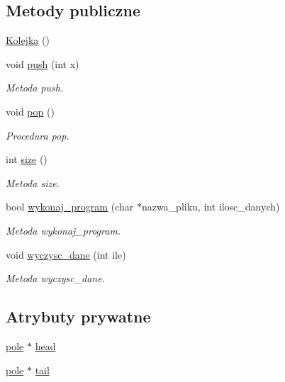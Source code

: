 \subsection*{Metody publiczne}
\begin{DoxyCompactItemize}
\item 
\hyperlink{class_kolejka_a37c886fdc73dce62b04da0381dec5484}{Kolejka} ()
\item 
void \hyperlink{class_kolejka_a220ee5f92afb7712ce2bc502decfa6c9}{push} (int x)
\begin{DoxyCompactList}\small\item\em Metoda push. \end{DoxyCompactList}\item 
void \hyperlink{class_kolejka_adfdd97205e15a3ce3d0e99af64122572}{pop} ()
\begin{DoxyCompactList}\small\item\em Procedura pop. \end{DoxyCompactList}\item 
int \hyperlink{class_kolejka_a82920d7b90e967a4d5e175a20fe6de68}{size} ()
\begin{DoxyCompactList}\small\item\em Metoda size. \end{DoxyCompactList}\item 
bool \hyperlink{class_kolejka_af849bac74dd62a28df378ed3f95b622e}{wykonaj\-\_\-program} (char $\ast$nazwa\-\_\-pliku, int ilosc\-\_\-danych)
\begin{DoxyCompactList}\small\item\em Metoda wykonaj\-\_\-program. \end{DoxyCompactList}\item 
void \hyperlink{class_kolejka_aaf67b4be89eaa07ebd9cbae057dc2b0d}{wyczysc\-\_\-dane} (int ile)
\begin{DoxyCompactList}\small\item\em Metoda wyczysc\-\_\-dane. \end{DoxyCompactList}\end{DoxyCompactItemize}
\subsection*{Atrybuty prywatne}
\begin{DoxyCompactItemize}
\item 
\hyperlink{structpole}{pole} $\ast$ \hyperlink{class_kolejka_a3d36327a29f61dc107ca0147ab4cbc52}{head}
\item 
\hyperlink{structpole}{pole} $\ast$ \hyperlink{class_kolejka_a9e4cb4e670cf69985de2a92e479d327f}{tail}
\end{DoxyCompactItemize}
